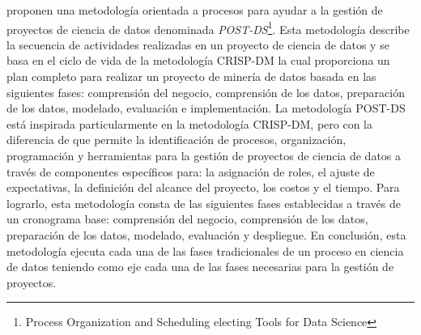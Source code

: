 \cite{Costa2020} proponen una metodología orientada a procesos para ayudar a la gestión de proyectos de ciencia de datos denominada \textit{POST-DS}\footnote{Process Organization and Scheduling electing Tools for Data Science}. Esta metodología describe la secuencia de actividades realizadas en un proyecto de ciencia de datos y se basa en el ciclo de vida de la metodología CRISP-DM la cual proporciona un plan completo para realizar un proyecto de minería de datos basada en las siguientes fases: comprensión del negocio, comprensión de los datos, preparación de los datos, modelado, evaluación e implementación. La metodología POST-DS está inspirada particularmente en la metodología CRISP-DM, pero con la diferencia de que permite la identificación de procesos, organización, programación y herramientas para la gestión de proyectos de ciencia de datos a través de componentes específicos para: la asignación de roles, el ajuste de expectativas, la definición del alcance del proyecto, los costos y el tiempo. Para lograrlo, esta metodología consta de las siguientes fases establecidas a través de un cronograma base: comprensión del negocio, comprensión de los datos, preparación de los datos, modelado, evaluación y despliegue. En conclusión, esta metodología ejecuta cada una de las fases tradicionales de un proceso en ciencia de datos teniendo como eje cada una de las fases necesarias para la gestión de proyectos.

